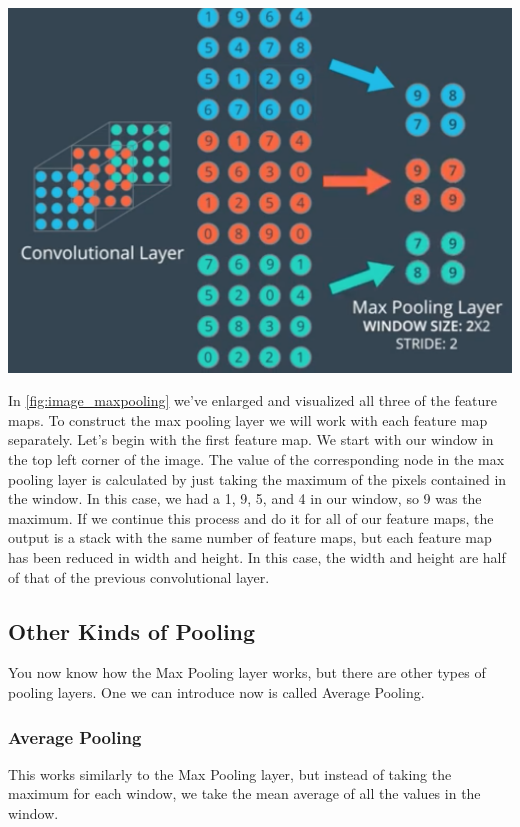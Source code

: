 \includegraphics[width=1\linewidth]{img//cnn//depth/image_maxpooling.png}
\label{fig:image_maxpooling}

In \autoref{fig:image_maxpooling} we've enlarged and visualized all three of the feature maps. To construct the max pooling layer we will work with each feature map separately.
Let's begin with the first feature map. We start with our window in the top left corner of the image. The value of the corresponding node in the max pooling layer is calculated by just taking the maximum of the pixels contained in the window. In this case, we had a 1, 9, 5, and 4 in our window, so 9 was the maximum.
If we continue this process and do it for all of our feature maps, the output is a stack with the same number of feature maps,
but each feature map has been reduced in width and height. In this case, the width and height are half of that of the previous convolutional layer.

\subsection{Other Kinds of Pooling}

You now know how the Max Pooling layer works, but there are other types of pooling layers. One we can introduce now is called Average Pooling.

\subsubsection{Average Pooling}

This works similarly to the Max Pooling layer, but instead of taking the maximum for each window, we take the mean average of all the values in the window.

